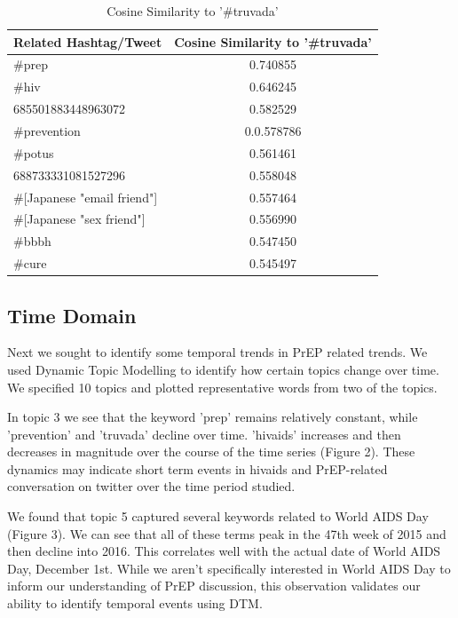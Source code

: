 \documentclass{sig-alternate-05-2015}
\begin{document}
\begin{table}
\centering
\caption{Cosine Similarity to '\#truvada'}
\begin{tabular}{|l|c|} \hline
Related Hashtag/Tweet & Cosine Similarity to '\#truvada'\\ \hline
\#prep & 0.740855\\ \hline
\#hiv & 0.646245\\ \hline
685501883448963072 & 0.582529\\ \hline
\#prevention & 0.0.578786\\ \hline
\#potus & 0.561461\\ \hline
688733331081527296 & 0.558048\\ \hline
\#[Japanese "email friend"] & 0.557464\\ \hline
\#[Japanese "sex friend"] & 0.556990\\ \hline
\#bbbh & 0.547450\\ \hline
\#cure & 	0.545497\\ \hline
\hline\end{tabular}
\end{table}


\subsection{Time Domain}


Next we sought to identify some temporal trends in PrEP related trends. We used Dynamic Topic Modelling to identify how certain topics change over time. We specified 10 topics and plotted representative words from two of the topics.

In topic 3 we see that the keyword 'prep' remains relatively constant, while 'prevention' and 'truvada' decline over time. 'hivaids' increases and then decreases in magnitude over the course of the time series (Figure 2). These dynamics may indicate short term events in hivaids and PrEP-related conversation on twitter over the time period studied.

We found that topic 5 captured several keywords related to World AIDS Day (Figure 3). We can see that all of these terms peak in the 47th week of 2015 and then decline into 2016. This correlates well with the actual date of World AIDS Day, December 1st. While we aren't specifically interested in World AIDS Day to inform our understanding of PrEP discussion, this observation validates our ability to identify temporal events using DTM.
\end{document}
